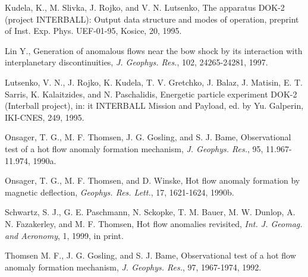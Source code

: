 \documentclass{article}
\begin{document}
\begin{article}
\begin{thebibliography}{}
Kudela, K., M. Slivka, J. Rojko, and V. N. Lutsenko, The
apparatus DOK-2 (project INTERBALL): Output data structure and
modes of operation, preprint of Inst. Exp. Phys. UEF-01-95,
Kosice, 20, 1995.

Lin Y., Generation of anomalous flows near the bow shock by
its interaction with interplanetary discontinuities, {\it J. Geophys.
Res.}, 102, 24265-24281, 1997.

Lutsenko, V. N., J. Rojko, K. Kudela, T. V. Gretchko, J. Balaz,
J. Matisin, E. T. Sarris, K. Kalaitzides, and N. Paschalidis,
Energetic particle experiment DOK-2 (Interball project), in:
{it INTERBALL Mission and Payload,} ed. by Yu. Galperin, IKI-CNES,
249, 1995.


Onsager, T. G., M. F. Thomsen, J. G. Gosling, and S. J.
Bame, Observational test of a hot flow anomaly formation
mechanism, {\it J. Geophys. Res.}, 95, 11.967-11.974, 1990a.

Onsager, T. G., M. F. Thomsen, and D. Winske,
Hot flow anomaly formation by magnetic deflection,
{\it Geophys. Res. Lett.}, 17, 1621-1624, 1990b.

Schwartz, S. J., G. E. Paschmann, N. Sckopke, T. M. Bauer, M. W.
Dunlop, A. N. Fazakerley, and M. F. Thomsen,  Hot flow anomalies
revisited, {\it Int. J. Geomag. and Aeronomy}, 1, 1999, in print.

Thomsen M. F., J. G. Gosling, and S. J.
Bame, Observational test of a hot flow anomaly formation
mechanism, {\it J. Geophys. Res.}, 97, 1967-1974, 1992.


\end{thebibliography}


\end{article}
\end{document}
